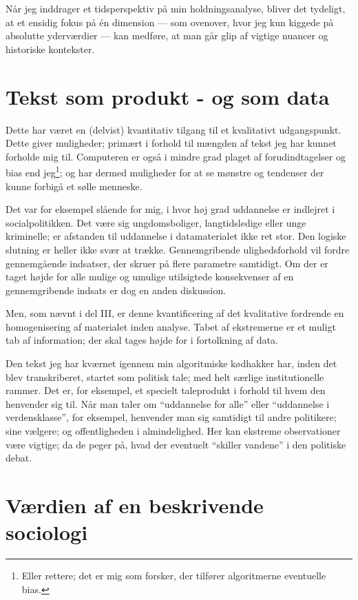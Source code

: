 Når jeg inddrager et tidsperspektiv på min holdningsanalyse, bliver det tydeligt, at et ensidig fokus på én dimension — som ovenover, hvor jeg kun kiggede på absolutte yderværdier — kan medføre, at man går glip af vigtige nuancer og historiske kontekster.

\section{Tekst som produkt - og som data}

Dette har været en (delvist) kvantitativ tilgang til et kvalitativt udgangspunkt.
Dette giver muligheder; primært i forhold til mængden af tekst jeg har kunnet forholde mig til.
Computeren er også i mindre grad plaget af forudindtagelser og bias end jeg\footnote{
Eller rettere; det er mig som forsker, der tilfører algoritmerne eventuelle bias.};
og har dermed muligheder for at se mønstre og tendenser der kunne forbigå et sølle menneske.

Det var for eksempel slående for mig, i hvor høj grad uddannelse er indlejret i socialpolitikken.
Det være sig ungdomsboliger, langtidsledige eller unge kriminelle; er afstanden til uddannelse i datamaterialet ikke ret stor.
Den logiske slutning er heller ikke svær at trække.
Gennemgribende ulighedsforhold vil fordre gennemgående indsatser, der skruer på flere parametre samtidigt.
Om der er taget højde for alle mulige og umulige utilsigtede konsekvenser af en gennemgribende indsats er dog en anden diskussion.

Men, som nævnt i del III, er denne kvantificering af det kvalitative fordrende en homogenisering af materialet inden analyse.
Tabet af ekstremerne er et muligt tab af information; der skal tages højde for i fortolkning af data.

Den tekst jeg har kværnet igennem min algoritmiske kødhakker har, inden det blev transkriberet, startet som politisk tale; med helt særlige institutionelle rammer.
Det er, for eksempel, et specielt taleprodukt i forhold til hvem den henvender sig til.
Når man taler om “uddannelse for alle” eller “uddannelse i verdensklasse”, for eksempel,
henvender man sig samtidigt til andre politikere; sine vælgere; og offentligheden i almindelighed.
Her kan ekstreme observationer være vigtige; da de peger på, hvad der eventuelt “skiller vandene” i den politiske debat.

\section{Værdien af en beskrivende sociologi}

